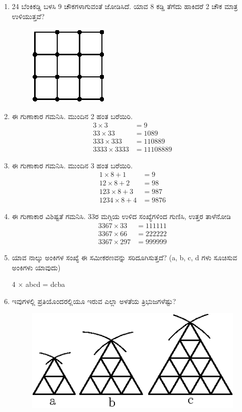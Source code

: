\begin{enumerate}
\item 24 ಬೆಂಕಿಕಡ್ಡಿ ಬಳಸಿ 9 ಚೌಕಗಳಾಗುವಂತೆ ಜೋಡಿಸಿದೆ. ಯಾವ 8 ಕಡ್ಡಿ ತೆಗೆದು ಹಾಕಿದರೆ 2 ಚೌಕ ಮಾತ್ರ ಉಳಿಯುತ್ತವೆ? 

\begin{figure}[H]
\centering
\includegraphics{images/chap3/q16.eps}
\end{figure}

\item ಈ ಗುಣಾಕಾರ ಗಮನಿಸಿ. ಮುಂದಿನ 2 ಹಂತ ಬರೆಯಿರಿ. 
\begin{align*}
3 \times 3 & = 9\\
33 \times 33 & = 1089\\
333 \times 333 & = 110889\\
3333 \times 3333 & = 11108889
\end{align*}

\item ಈ ಗುಣಾಕಾರ ಗಮನಿಸಿ. ಮುಂದಿನ 3 ಹಂತ ಬರೆಯಿರಿ. 
\begin{align*}
1 \times 8 + 1 & = 9\\
12 \times 8 + 2 & = 98\\
123 \times 8 + 3 & = 987\\
1234 \times 8 + 4 & = 9876
\end{align*}

\item ಈ ಗುಣಾಕಾರ ವಿಶಿಷ್ಟತೆ ಗಮನಿಸಿ. 33ರ ಮಗ್ಗಿಯ ಉಳಿದ ಸಂಖ್ಯೆಗಳಿಂದ ಗುಣಿಸಿ, ಉತ್ತರ ತಾಳೆನೋಡಿ 
\begin{align*}
3367 \times 33 & = 111111\\
3367 \times 66 & = 222222\\[0.2cm]
3367 \times 297 & = 999999
\end{align*}

\item ಯಾವ ನಾಲ್ಕು ಅಂಕಿಗಳ ಸಂಖ್ಯೆ ಈ ಸಮೀಕರಣವನ್ನು ಸರಿದೂಗಿಸುತ್ತದೆ? (a, b, c, d ಗಳು ಸೂಚಿಸುವ ಅಂಕಿಗಳು ಯಾವುದು)

4 $\times$ abcd = dcba

\item ಇವುಗಳಲ್ಲಿ ಪ್ರತಿಯೊಂದರಲ್ಲಿಯೂ ಇರುವ ಎಲ್ಲಾ ಅಳತೆಯ ತ್ರಿಭುಜಗಳೆಷ್ಟು?

\begin{figure}[H]
\centering
\includegraphics{images/chap3/q21.eps}
\end{figure}


\end{enumerate}
